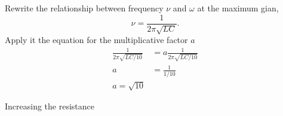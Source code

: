 \begin{enumerate}
  Rewrite the relationship between frequency $\nu$ and $\omega$ at the maximum gian,
  \begin{equation*}
    \nu = \frac{1}{2 \pi \sqrt{LC}}. 
  \end{equation*}
  Apply it the equation for the multiplicative factor $a$
  \begin{align*}
    \frac{1}{2 \pi \sqrt{L C/10}} &= a \frac{1}{2 \pi \sqrt{L C/10}} \\
    a &= \frac{1}{1/ 10} \\
    a = \sqrt{10}    
  \end{align*}
\end{enumerate}

\begin{exercise}
  Increasing the resistance
\end{exercise}


